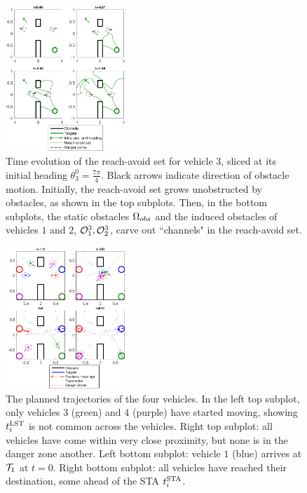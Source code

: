 \begin{figure}
	\centering
	\includegraphics[width=0.4\textwidth]{"fig/dubins_reach_3"}
	\caption{Time evolution of the reach-avoid set for vehicle $3$, sliced at its initial heading $\theta_3^0=\frac{7\pi}{4}$. Black arrows indicate direction of obstacle motion. Initially, the reach-avoid set grows unobstructed by obstacles, as shown in the top subplots. Then, in the bottom subplots, the static obstacles $\Omega_{obs}$ and the induced obstacles of vehicles $1$ and $2$, $\mathcal{O}^3_1,\mathcal{O}^3_2$, carve out ``channels" in the reach-avoid set.}
	\label{fig:dubins_reach_3}
\end{figure}

\begin{figure}
	\centering
	\includegraphics[width=0.4\textwidth]{"fig/dubins_result"}
	\caption{The planned trajectories of the four vehicles. In the left top subplot, only vehicles $3$ (green) and $4$ (purple) have started moving, showing $t^{\text{LST}}_i$ is not common across the vehicles. Right top subplot: all vehicles have come within very close proximity, but none is in the danger zone another. Left bottom subplot: vehicle $1$ (blue) arrives at $\mathcal{T}_1$ at $t=0$. Right bottom subplot: all vehicles have reached their destination, some ahead of the STA $t^{\text{STA}}_i$.}
	\label{fig:dubins_result}
\end{figure}